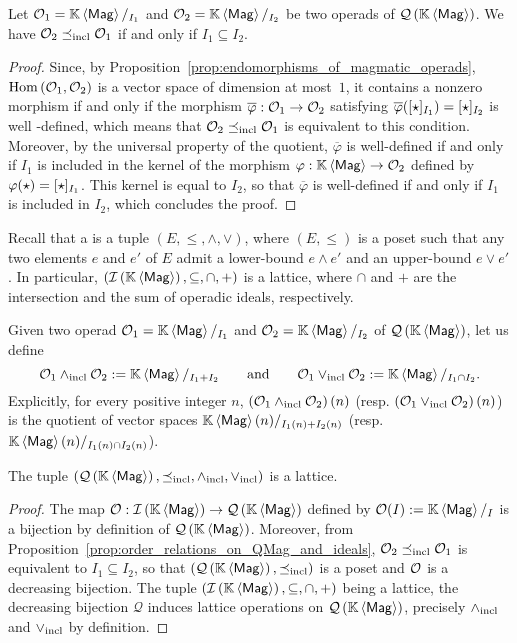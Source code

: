 \begin{Proposition} \label{prop:order_relations_on_QMag_and_ideals}
    Let $\Oca_1=\KMag/_{I_1}$ and $\Oca_2=\KMag/_{I_2}$ be two operads
    of $\QMag$. We have $\Oca_2\OrdQMag\Oca_1$ if and only if
    $I_1\subseteq I_2$.
\end{Proposition}
\begin{proof}
  Since, by Proposition~\ref{prop:endomorphisms_of_magmatic_operads},
  $\Hom\left(\Oca_1,\Oca_2\right)$ is a vector space of
  dimension at most~$1$, it contains a nonzero morphism if and only if
  the morphism $\overline{\varphi}:\Oca_1\to\Oca_2$ satisfying
  $\overline{\varphi}([\Product]_{I_1})=[\Product]_{I_2}$ is well
  -defined, which means that $\Oca_2\OrdQMag\Oca_1$ is equivalent to this
  condition. Moreover, by the universal property of the quotient,
  $\overline{\varphi}$ is well-defined if and only if $I_1$ is included
  in the kernel of the morphism $\varphi:\KMag\to\Oca_2$ defined by
  $\varphi(\Product)=[\Product]_{I_1}$. This kernel is equal to
  $I_2$, so that $\overline{\varphi}$ is well-defined if and only if
  $I_1$ is included in $I_2$, which concludes the proof.
\end{proof}
\medbreak

Recall that a  is a tuple
$\left(E,\leq,\wedge,\vee\right)$, where $\left(E,\leq\right)$ is a
poset such that any two elements $e$ and $e'$ of $E$ admit a lower-bound
$e\wedge e'$ and an upper-bound $e\vee e'$. In particular,
$\left(\IMag,\subseteq,\cap,+\right)$ is a lattice, where $\cap$ and $+$
are the intersection and the sum of operadic ideals, respectively.
\medbreak

Given two operad $\Oca_1=\KMag/_{I_1}$ and $\Oca_2=\KMag/_{I_2}$ of
$\QMag$, let us define
\begin{equation} \label{equ:definition_of_lattice_operations_of_QMag}
    \Oca_1\InfQMag \Oca_2 := \KMag/_{I_1+I_2}
    \qquad \mbox{and} \qquad
    \Oca_1\SupQMag \Oca_2 := \KMag/_{I_1\cap I_2}.
\end{equation}
Explicitly, for every positive integer $n$,
$\left(\Oca_1\InfQMag\Oca_2\right)(n)$ (resp.
$\left(\Oca_1\SupQMag\Oca_2\right)(n)$) is the quotient of vector spaces
$\KMag(n)/_{I_1(n)+I_2(n)}$ (resp.
$\KMag(n)/_{I_1(n)\cap I_2(n)}$).
\medbreak

\begin{Theorem} \label{thm:lattice_structure_of_QMag}
    The tuple $\LatQMag$ is a lattice.
\end{Theorem}
\begin{proof}
  The map $\Oca:\IMag\to\QMag$ defined by $\Oca(I) := \KMag/_I$ is a
  bijection by definition of $\QMag$. Moreover, from
    Proposition~\ref{prop:order_relations_on_QMag_and_ideals},
    $\Oca_2\OrdQMag\Oca_1$ is equivalent to $I_1\subseteq I_2$, so that
    $\left(\QMag,\OrdQMag\right)$ is a poset and $\Oca$ is a decreasing
    bijection. The tuple $\left(\IMag,\subseteq,\cap,+\right)$ being a
    lattice, the decreasing bijection $\mathcal{Q}$ induces lattice
    operations on $\QMag$, precisely $\InfQMag$ and $\SupQMag$ by
    definition.
\end{proof}
\medbreak

